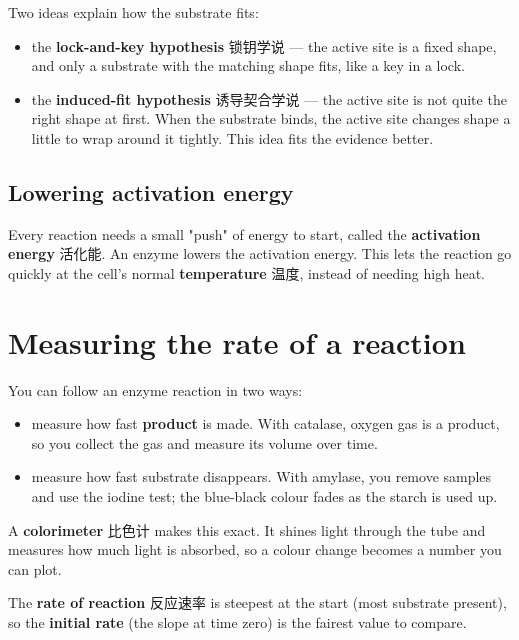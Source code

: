 \documentclass[11pt]{article}
\begin{document}
Two ideas explain how the substrate fits:

\begin{itemize}
\item the \textbf{lock-and-key hypothesis} 锁钥学说 — the active site is a fixed shape, and only a substrate with the matching shape fits, like a key in a lock.

\item the \textbf{induced-fit hypothesis} 诱导契合学说 — the active site is not quite the right shape at first. When the substrate binds, the active site changes shape a little to wrap around it tightly. This idea fits the evidence better.

\end{itemize}

\subsection*{Lowering activation energy}

Every reaction needs a small "push" of energy to start, called the \textbf{activation energy} 活化能. An enzyme lowers the activation energy. This lets the reaction go quickly at the cell's normal \textbf{temperature} 温度, instead of needing high heat.

\section*{Measuring the rate of a reaction}

You can follow an enzyme reaction in two ways:

\begin{itemize}
\item measure how fast \textbf{product} is made. With catalase, oxygen gas is a product, so you collect the gas and measure its volume over time.

\item measure how fast substrate disappears. With amylase, you remove samples and use the iodine test; the blue-black colour fades as the starch is used up.

\end{itemize}

A \textbf{colorimeter} 比色计 makes this exact. It shines light through the tube and measures how much light is absorbed, so a colour change becomes a number you can plot.

The \textbf{rate of reaction} 反应速率 is steepest at the start (most substrate present), so the \textbf{initial rate} (the slope at time zero) is the fairest value to compare.
\end{document}
